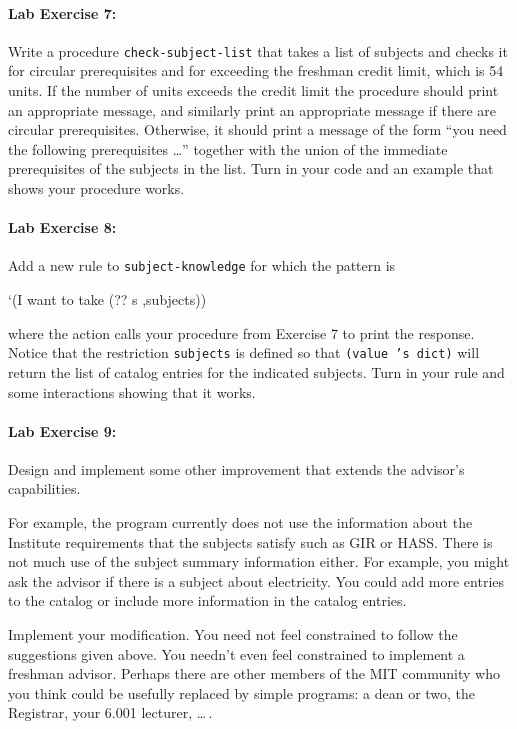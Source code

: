 \paragraph{Lab Exercise 7:}
Write a procedure {\tt check-subject-list} that takes a list of
subjects and checks it for circular prerequisites and for exceeding
the freshman credit limit, which is 54 units.  If the number of units
exceeds the credit limit the procedure should print an appropriate
message, and similarly print an appropriate message if there are
circular prerequisites.  Otherwise, it should print a message of the
form ``you need the following prerequisites \ldots'' together with the
union of the immediate prerequisites of the subjects in the list.
Turn in your code and an example that shows your procedure works.

\paragraph{Lab Exercise 8:}
Add a new rule to {\tt subject-knowledge} for which the pattern is

\beginlisp
`(I want to take (?? s ,subjects))
\endlisp

\noindent where the action calls your procedure from Exercise 7 to
print the response.  Notice that the restriction {\tt subjects} is
defined so that {\tt (value 's dict)} will return the list of
catalog entries for the indicated subjects.  Turn in your rule and
some interactions showing that it works.

\paragraph{Lab Exercise 9:}
Design and implement some other improvement that extends the advisor's
capabilities.

For example, the program currently does not use the information about the
Institute requirements that the subjects satisfy such as GIR or HASS.
There is not much use of the subject summary information either.
For example, you might ask the advisor if there is a subject about
electricity.  You could add more entries to the catalog or include more
information in the catalog entries.

Implement your modification.  You need not feel constrained to follow
the suggestions given above.  You needn't even feel constrained to
implement a freshman advisor.  Perhaps there are other members of the
MIT community who you think could be usefully replaced by simple
programs: a dean or two, the Registrar, your 6.001 lecturer, \ldots\,.

